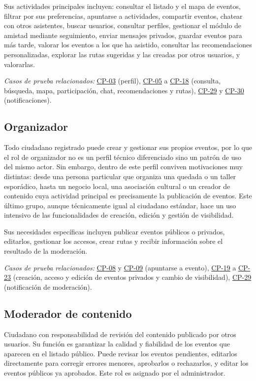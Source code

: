 Sus actividades principales incluyen: consultar el listado y el mapa de eventos, filtrar por sus preferencias, apuntarse a actividades, compartir eventos, chatear con otros asistentes, buscar usuarios, consultar perfiles, gestionar el módulo de amistad mediante seguimiento, enviar mensajes privados, guardar eventos para más tarde, valorar los eventos a los que ha asistido, consultar las recomendaciones personalizadas, explorar las rutas sugeridas y las creadas por otros usuarios, y valorarlas.

\textit{Casos de prueba relacionados:} \hyperref[cp:03]{CP-03} (perfil), \hyperref[cp:05]{CP-05} a \hyperref[cp:18]{CP-18} (consulta, búsqueda, mapa, participación, chat, recomendaciones y rutas), \hyperref[cp:29]{CP-29} y \hyperref[cp:30]{CP-30} (notificaciones).

\subsection{Organizador}

Todo ciudadano registrado puede crear y gestionar sus propios eventos, por lo que el rol de organizador no es un perfil técnico diferenciado sino un patrón de uso del mismo actor. Sin embargo, dentro de este perfil conviven motivaciones muy distintas: desde una persona particular que organiza una quedada o un taller esporádico, hasta un negocio local, una asociación cultural o un creador de contenido cuya actividad principal es precisamente la publicación de eventos. Este último grupo, aunque técnicamente igual al ciudadano estándar, hace un uso intensivo de las funcionalidades de creación, edición y gestión de visibilidad.

Sus necesidades específicas incluyen publicar eventos públicos o privados, editarlos, gestionar los accesos, crear rutas y recibir información sobre el resultado de la moderación.

\textit{Casos de prueba relacionados:} \hyperref[cp:08]{CP-08} y \hyperref[cp:09]{CP-09} (apuntarse a evento), \hyperref[cp:19]{CP-19} a \hyperref[cp:23]{CP-23} (creación, acceso y edición de eventos privados y cambio de visibilidad), \hyperref[cp:29]{CP-29} (notificación de moderación).

\subsection{Moderador de contenido}

Ciudadano con responsabilidad de revisión del contenido publicado por otros usuarios. Su función es garantizar la calidad y fiabilidad de los eventos que aparecen en el listado público. Puede revisar los eventos pendientes, editarlos directamente para corregir errores menores, aprobarlos o rechazarlos, y editar los eventos públicos ya aprobados. Este rol es asignado por el administrador.

